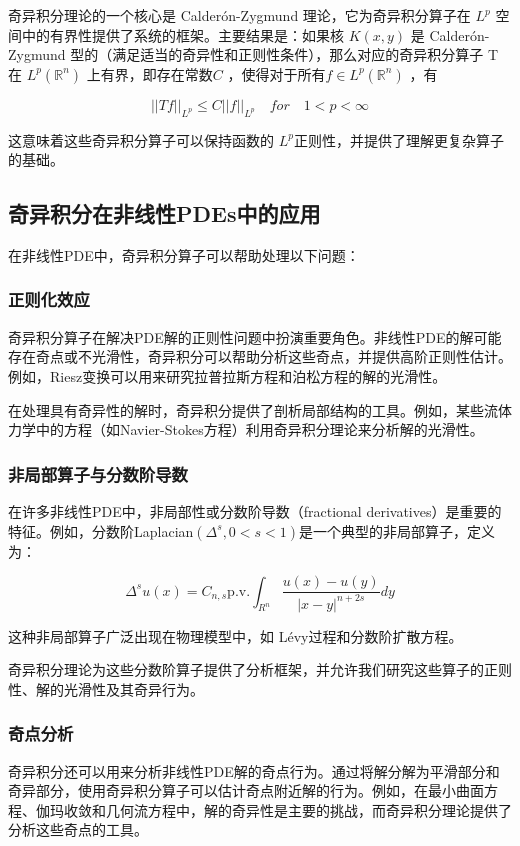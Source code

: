 \documentclass{article}
\begin{document}
奇异积分理论的一个核心是 Calderón-Zygmund 理论，它为奇异积分算子在  $ L^p $ 空间中的有界性提供了系统的框架。主要结果是：如果核 \( K(x,y)\)  是 Calderón-Zygmund 型的（满足适当的奇异性和正则性条件），那么对应的奇异积分算子 T 在 $L^p(\mathbb{R}^n)$ 上有界，即存在常数$C$ ，使得对于所有$f \in L^p(\mathbb{R}^n) $ ，有

\[ ||Tf||_{L^p} \leq C||f||_{L^p}  \quad for \quad  1 < p < \infty \]

这意味着这些奇异积分算子可以保持函数的  $L^p$正则性，并提供了理解更复杂算子的基础。

\subsection{奇异积分在非线性PDEs中的应用}

在非线性PDE中，奇异积分算子可以帮助处理以下问题：
\subsubsection{正则化效应}
奇异积分算子在解决PDE解的正则性问题中扮演重要角色。非线性PDE的解可能存在奇点或不光滑性，奇异积分可以帮助分析这些奇点，并提供高阶正则性估计。例如，Riesz变换可以用来研究拉普拉斯方程和泊松方程的解的光滑性。

在处理具有奇异性的解时，奇异积分提供了剖析局部结构的工具。例如，某些流体力学中的方程（如Navier-Stokes方程）利用奇异积分理论来分析解的光滑性。

\subsubsection{非局部算子与分数阶导数}

在许多非线性PDE中，非局部性或分数阶导数（fractional derivatives）是重要的特征。例如，分数阶Laplacian\(( \Delta^s, 0<s<1) \)是一个典型的非局部算子，定义为：

\[
\Delta^s u(x) = C_{n,s} \text{p.v.} \int_{R^n} \dfrac{u(x)-u(y)}{|x-y|^{n + 2s}}dy
\]

这种非局部算子广泛出现在物理模型中，如 Lévy过程和分数阶扩散方程。

奇异积分理论为这些分数阶算子提供了分析框架，并允许我们研究这些算子的正则性、解的光滑性及其奇异行为。


\subsubsection{奇点分析}
奇异积分还可以用来分析非线性PDE解的奇点行为。通过将解分解为平滑部分和奇异部分，使用奇异积分算子可以估计奇点附近解的行为。例如，在最小曲面方程、伽玛收敛和几何流方程中，解的奇异性是主要的挑战，而奇异积分理论提供了分析这些奇点的工具。
\end{document}
